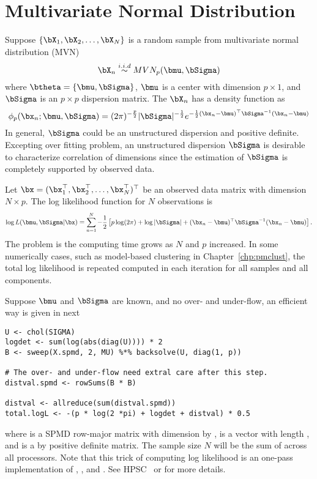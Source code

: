 \section{Multivariate Normal Distribution}
\label{sec:mvn}


Suppose $\{\bX_1,\bX_2,\ldots,\bX_N\}$ is a random sample from
multivariate normal distribution
(MVN)
\begin{equation}
\bX_n \stackrel{i.i.d}{\sim} MVN_p(\bmu, \bSigma)
\label{eqn:mvn_p}
\end{equation}
where $\btheta = \{\bmu, \bSigma\}$, $\bmu$ is a center with
dimension $p\times 1$, and $\bSigma$ is an $p\times p$ dispersion
matrix.
The $\bX_n$ has a density function as
\begin{equation*}
\displaystyle
\phi_p(\bx_n; \bmu, \bSigma) =
(2\pi)^{-\frac{p}{2}} |\bSigma|^{-\frac{1}{2}}
e^{-\frac{1}{2} (\bx_n - \bmu)^\top \bSigma^{-1} (\bx_n - \bmu)}
\end{equation*}
In general, $\bSigma$ could be an unstructured dispersion and positive
definite. Excepting over fitting problem,
an unstructured dispersion $\bSigma$ is desirable to
characterize correlation of dimensions since the estimation of
$\bSigma$ is completely supported by observed data.

Let $\bx = (\bx_1^\top, \bx_2^\top, \ldots, \bx_N^\top)^\top$
be an observed data matrix with dimension $N\times p$.
The log likelihood function for $N$ observations is
\begin{equation*}
\displaystyle
\log L(\bmu, \bSigma|\bx) = \sum_{n = 1}^N
-\frac{1}{2}
\left[
p\log(2\pi) + \log|\bSigma| + (\bx_n - \bmu)^\top \bSigma^{-1} (\bx_n - \bmu)
\right].
\label{eqn:log_likelihood_mvn_p}
\end{equation*}
The problem is the computing time grows as $N$ and $p$ increased.
In some numerically cases, such as model-based clustering
in Chapter~\ref{chp:pmclust}, the total log likelihood is
repeated computed in each iteration for all samples and all components.

Suppose $\bmu$ and $\bSigma$ are known, and no over- and under-flow,
an efficient way is given in next
\begin{lstlisting}[language=rr,title=R Code]
U <- chol(SIGMA)
logdet <- sum(log(abs(diag(U)))) * 2
B <- sweep(X.spmd, 2, MU) %*% backsolve(U, diag(1, p))

# The over- and under-flow need extral care after this step.
distval.spmd <- rowSums(B * B)

distval <- allreduce(sum(distval.spmd))
total.logL <- -(p * log(2 *pi) + logdet + distval) * 0.5
\end{lstlisting}
where  is a SPMD row-major matrix with dimension
 by ,  is a vector with length , and
 is a  by  positive definite matrix.
The sample size $N$ will be the sum of  across all processors.
Note that this trick of computing log likelihood is an one-pass implementation
of , , and .
See HPSC~\citep{hpsc2011} or \citet{gvl} for more details.





